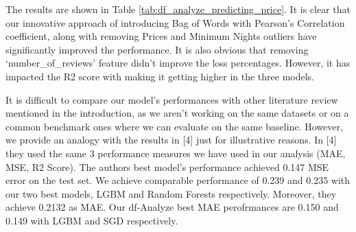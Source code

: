 \documentclass[a4paper,12pt]{article}
\begin{document}
\begin{table}[h!]
    \centering
    \caption{df-Analyze Results of Predicting Price Feature}
    \label{tab:df_analyze_predicting_price}
\end{table}

The results are shown in Table \ref{tab:df_analyze_predicting_price}. It is clear that our innovative approach of introducing Bag of Words with Pearson's Correlation coefficient, along with removing Prices and Minimum Nights outliers have significantly improved the performance. It is also obvious that removing `number\_of\_reviews' feature didn't improve the loss percentages. However, it has impacted the R2 score with making it getting higher in the three models.

It is difficult to compare our model's performances with other literature review mentioned in the introduction, as we aren't working on the same datasets or on a common benchmark ones where we can evaluate on the same baseline. However, we provide an analogy with the results in [4] just for illustrative reasons. In [4] they used the same 3 performance measures we have used in our analysis (MAE, MSE, R2 Score). The authors best model's performance achieved 0.147 MSE error on the test set. We achieve comparable performance of 0.239 and 0.235 with our two best models, LGBM and Random Forests respectively. Moreover, they achieve 0.2132 as MAE. Our df-Analyze best MAE perofrmances are 0.150 and 0.149 with LGBM and SGD respectively.
\end{document}
